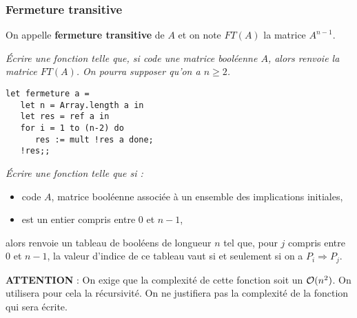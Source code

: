 \subsubsection{Fermeture transitive}
On appelle {\bf fermeture transitive} de $A$ et on note $FT(A)$
    la matrice $A^{n - 1}$.
\begin{Exercise}\it
Écrire une  fonction  telle que,  si  code une matrice booléenne $A$, alors  renvoie la matrice $FT(A)$. On pourra supposer qu'on a $n\ge 2$.
\end{Exercise}
\begin{Answer}
\begin{lstlisting}
let fermeture a = 
   let n = Array.length a in
   let res = ref a in
   for i = 1 to (n-2) do
      res := mult !res a done;
   !res;;        

\end{lstlisting}
\end{Answer}
\begin{Exercise}\it
Écrire une fonction  telle que si :
\begin{itemize}
\item {} code $A$, matrice booléenne associée à un ensemble des implications initiales,
\item {} est un entier compris entre 0 et $n - 1$,
\end{itemize}
alors  renvoie un tableau de booléens de longueur $n$ tel que, pour $j$ compris entre 0 et $n - 1$, la valeur d'indice  de ce tableau vaut  si et seulement si on a $P_{i}\Rightarrow P_{j}$.

{\bf ATTENTION} : On exige que la complexité de cette fonction soit un ${\cal O}(n^2)$. On utilisera pour cela la récursivité. On ne justifiera pas la complexité de la fonction qui sera écrite.
\end{Exercise}
